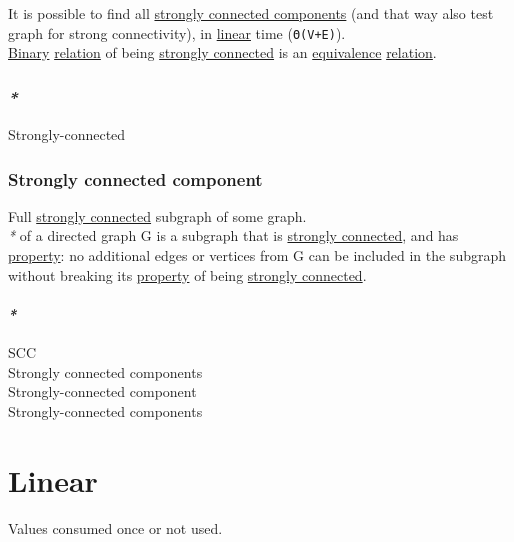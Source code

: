 \documentclass[a4paper,14pt,oneside]{book}
\begin{document}
It is possible to find all \hyperref[orgb7dfe3a]{strongly connected components} (and that way also test graph for strong connectivity), in \hyperref[org896eb61]{linear} time (\texttt{Θ(V+E)}).\\

\hyperref[orgd4bd390]{Binary} \hyperref[org3bec6ce]{relation} of being \hyperref[orgb8989f4]{strongly connected} is an \hyperref[orga6050b4]{equivalence} \hyperref[org3bec6ce]{relation}.\\

\subsection{\emph{*}}
\label{sec:org8663d8d}

\label{org0c077fc}Strongly-connected\\

\subsection{\label{orgeb610ae}Strongly connected component}
\label{sec:orgb177cda}
Full \hyperref[orgb8989f4]{strongly connected} subgraph of some graph.\\

\emph{*} of a directed graph G is a subgraph that is \hyperref[orgb8989f4]{strongly connected}, and has \hyperref[org217f324]{property}: no additional edges or vertices from G can be included in the subgraph without breaking its \hyperref[org217f324]{property} of being \hyperref[orgb8989f4]{strongly connected}.\\

\subsubsection{\emph{*}}
\label{sec:org66d4140}

\label{org4f9a6c9}SCC\\
\label{orgb7dfe3a}Strongly connected components\\
\label{org8bc3efb}Strongly-connected component\\
\label{org2108a1f}Strongly-connected components\\

\chapter{\label{org896eb61}Linear}
\label{sec:orgecc4f62}
Values consumed once or not used.\\
\end{document}
